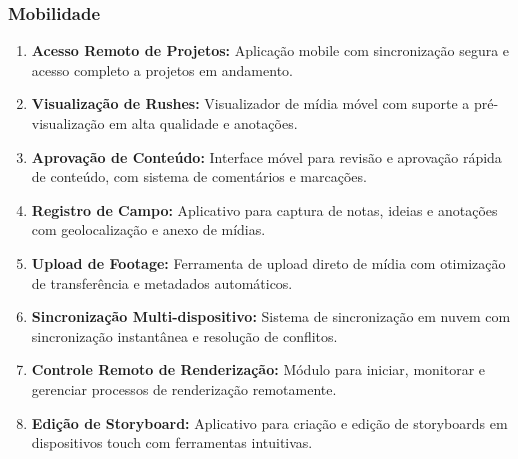 \subsubsection{Mobilidade}
\begin{enumerate}[leftmargin=*]
    \item \textbf{Acesso Remoto de Projetos:} Aplicação mobile com sincronização segura e acesso completo a projetos em andamento.
    \item \textbf{Visualização de Rushes:} Visualizador de mídia móvel com suporte a pré-visualização em alta qualidade e anotações.
    \item \textbf{Aprovação de Conteúdo:} Interface móvel para revisão e aprovação rápida de conteúdo, com sistema de comentários e marcações.
    \item \textbf{Registro de Campo:} Aplicativo para captura de notas, ideias e anotações com geolocalização e anexo de mídias.
    \item \textbf{Upload de Footage:} Ferramenta de upload direto de mídia com otimização de transferência e metadados automáticos.
    \item \textbf{Sincronização Multi-dispositivo:} Sistema de sincronização em nuvem com sincronização instantânea e resolução de conflitos.
    \item \textbf{Controle Remoto de Renderização:} Módulo para iniciar, monitorar e gerenciar processos de renderização remotamente.
    \item \textbf{Edição de Storyboard:} Aplicativo para criação e edição de storyboards em dispositivos touch com ferramentas intuitivas.
\end{enumerate}

